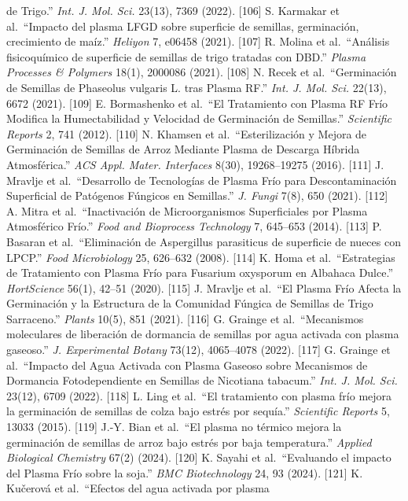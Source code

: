 \documentclass[
  11pt,
  letterpaper,
]{article}
\begin{document}
de Trigo.'' \emph{Int. J. Mol. Sci.} 23(13), 7369 (2022). {[}106{]} S.
Karmakar et al.~``Impacto del plasma LFGD sobre superficie de semillas,
germinación, crecimiento de maíz.'' \emph{Heliyon} 7, e06458 (2021).
{[}107{]} R. Molina et al.~``Análisis fisicoquímico de superficie de
semillas de trigo tratadas con DBD.'' \emph{Plasma Processes \&
Polymers} 18(1), 2000086 (2021). {[}108{]} N. Recek et al.~``Germinación
de Semillas de Phaseolus vulgaris L. tras Plasma RF.'' \emph{Int. J.
Mol. Sci.} 22(13), 6672 (2021). {[}109{]} E. Bormashenko et al.~``El
Tratamiento con Plasma RF Frío Modifica la Humectabilidad y Velocidad de
Germinación de Semillas.'' \emph{Scientific Reports} 2, 741 (2012).
{[}110{]} N. Khamsen et al.~``Esterilización y Mejora de Germinación de
Semillas de Arroz Mediante Plasma de Descarga Híbrida Atmosférica.''
\emph{ACS Appl. Mater. Interfaces} 8(30), 19268--19275 (2016). {[}111{]}
J. Mravlje et al.~``Desarrollo de Tecnologías de Plasma Frío para
Descontaminación Superficial de Patógenos Fúngicos en Semillas.''
\emph{J. Fungi} 7(8), 650 (2021). {[}112{]} A. Mitra et
al.~``Inactivación de Microorganismos Superficiales por Plasma
Atmosférico Frío.'' \emph{Food and Bioprocess Technology} 7, 645--653
(2014). {[}113{]} P. Basaran et al.~``Eliminación de Aspergillus
parasiticus de superficie de nueces con LPCP.'' \emph{Food Microbiology}
25, 626--632 (2008). {[}114{]} K. Homa et al.~``Estrategias de
Tratamiento con Plasma Frío para Fusarium oxysporum en Albahaca Dulce.''
\emph{HortScience} 56(1), 42--51 (2020). {[}115{]} J. Mravlje et
al.~``El Plasma Frío Afecta la Germinación y la Estructura de la
Comunidad Fúngica de Semillas de Trigo Sarraceno.'' \emph{Plants} 10(5),
851 (2021). {[}116{]} G. Grainge et al.~``Mecanismos moleculares de
liberación de dormancia de semillas por agua activada con plasma
gaseoso.'' \emph{J. Experimental Botany} 73(12), 4065--4078 (2022).
{[}117{]} G. Grainge et al.~``Impacto del Agua Activada con Plasma
Gaseoso sobre Mecanismos de Dormancia Fotodependiente en Semillas de
Nicotiana tabacum.'' \emph{Int. J. Mol. Sci.} 23(12), 6709 (2022).
{[}118{]} L. Ling et al.~``El tratamiento con plasma frío mejora la
germinación de semillas de colza bajo estrés por sequía.''
\emph{Scientific Reports} 5, 13033 (2015). {[}119{]} J.-Y. Bian et
al.~``El plasma no térmico mejora la germinación de semillas de arroz
bajo estrés por baja temperatura.'' \emph{Applied Biological Chemistry}
67(2) (2024). {[}120{]} K. Sayahi et al.~``Evaluando el impacto del
Plasma Frío sobre la soja.'' \emph{BMC Biotechnology} 24, 93 (2024).
{[}121{]} K. Kučerová et al.~``Efectos del agua activada por plasma
\end{document}
